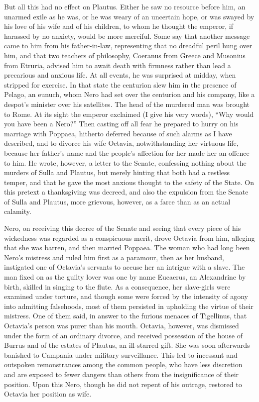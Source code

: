 
But all this had no effect on Plautus. Either he saw no resource before him, an unarmed exile as he was, or he was weary of an uncertain hope, or was swayed by his love of his wife and of his children, to whom he thought the emperor, if harassed by no anxiety, would be more merciful. Some say that another message came to him from his father-in-law, representing that no dreadful peril hung over him, and that two teachers of philosophy, Coeranus from Greece and Musonius from Etruria, advised him to await death with firmness rather than lead a precarious and anxious life. At all events, he was surprised at midday, when stripped for exercise. In that state the centurion slew him in the presence of Pelago, an eunuch, whom Nero had set over the centurion and his company, like a despot's minister over his satellites. The head of the murdered man was brought to Rome. At its sight the emperor exclaimed (I give his very words), ``Why would you have been a Nero?'' Then casting off all fear he prepared to hurry on his marriage with Poppaea, hitherto deferred because of such alarms as I have described, and to divorce his wife Octavia, notwithstanding her virtuous life, because her father's name and the people's affection for her made her an offence to him. He wrote, however, a letter to the Senate, confessing nothing about the murders of Sulla and Plautus, but merely hinting that both had a restless temper, and that he gave the most anxious thought to the safety of the State. On this pretext a thanksgiving was decreed, and also the expulsion from the Senate of Sulla and Plautus, more grievous, however, as a farce than as an actual calamity.


Nero, on receiving this decree of the Senate and seeing that every piece of his wickedness was regarded as a conspicuous merit, drove Octavia from him, alleging that she was barren, and then married Poppaea. The woman who had long been Nero's mistress and ruled him first as a paramour, then as her husband, instigated one of Octavia's servants to accuse her an intrigue with a slave. The man fixed on as the guilty lover was one by name Eucaerus, an Alexandrine by birth, skilled in singing to the flute. As a consequence, her slave-girls were examined under torture, and though some were forced by the intensity of agony into admitting falsehoods, most of them persisted in upholding the virtue of their mistress. One of them said, in answer to the furious menaces of Tigellinus, that Octavia's person was purer than his mouth. Octavia, however, was dismissed under the form of an ordinary divorce, and received possession of the house of Burrus and of the estates of Plautus, an ill-starred gift. She was soon afterwards banished to Campania under military surveillance. This led to incessant and outspoken remonstrances among the common people, who have less discretion and are exposed to fewer dangers than others from the insignificance of their position. Upon this Nero, though he did not repent of his outrage, restored to Octavia her position as wife.


